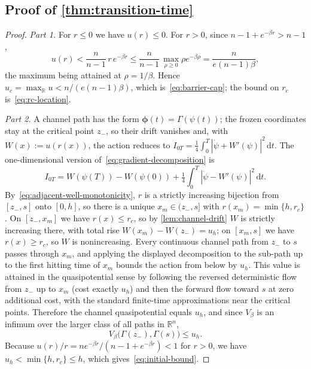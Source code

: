 \documentclass{article}
\newcommand{\dd}{\mathrm d}
\theoremstyle{plain}
\theoremstyle{definition}
\theoremstyle{remark}
\newcommand{\R}{\mathbb{R}}
\begin{document}
\subsection{Proof of \texorpdfstring{\ref{thm:transition-time}}{Theorem 3.1}}
 
\begin{proof}
\emph{Part 1.}
For \(r\le0\) we have \(u(r)\le0\). For \(r>0\), since \(n-1+e^{-\beta r}>n-1\),
\[
    u(r)<\frac{n}{n-1}\,r\,e^{-\beta r}
    \le\frac{n}{n-1}\,\max_{\rho\ge0}\rho e^{-\beta\rho}
    =\frac{n}{e(n-1)\beta},
\]
the maximum being attained at \(\rho=1/\beta\). Hence \(u_c=\max_\R u<n/(e(n-1)\beta)\), which is~\eqref{eq:barrier-cap}; the bound on \(r_c\) is~\eqref{eq:rc-location}.
 
\emph{Part 2.}
A channel path has the form \(\boldsymbol\phi(t)=\Gamma(\psi(t))\); the frozen coordinates stay at the critical point \(z_-\), so their drift vanishes and, with \(W(x):=u(r(x))\), the action reduces to \(I_{0T}=\tfrac14\int_0^T|\dot\psi+W'(\psi)|^2\,\dd t\). The one-dimensional version of~\eqref{eq:gradient-decomposition} is
\[
    I_{0T}=W(\psi(T))-W(\psi(0))+\tfrac14\int_0^T|\dot\psi-W'(\psi)|^2\,\dd t .
\]
By~\eqref{eq:adjacent-well-monotonicity}, \(r\) is a strictly increasing bijection from \([z_-,s]\) onto \([0,h]\), so there is a unique \(x_m\in(z_-,s]\) with \(r(x_m)=\min\{h,r_c\}\). On \([z_-,x_m]\) we have \(r(x)\le r_c\), so by \ref{lem:channel-drift} \(W\) is strictly increasing there, with total rise \(W(x_m)-W(z_-)=u_h\); on \([x_m,s]\) we have \(r(x)\ge r_c\), so \(W\) is nonincreasing. Every continuous channel path from \(z_-\) to \(s\) passes through \(x_m\), and applying the displayed decomposition to the sub-path up to the first hitting time of \(x_m\) bounds the action from below by \(u_h\). This value is attained in the quasipotential sense by following the reversed deterministic flow from \(z_-\) up to \(x_m\) (cost exactly \(u_h\)) and then the forward flow toward \(s\) at zero additional cost, with the standard finite-time approximations near the critical points. Therefore the channel quasipotential equals \(u_h\), and since \(V_\beta\) is an infimum over the larger class of all paths in \(\R^n\),
\[
    V_\beta\bigl(\Gamma(z_-),\Gamma(s)\bigr)\le u_h .
\]
Because \(u(r)/r=ne^{-\beta r}/(n-1+e^{-\beta r})<1\) for \(r>0\), we have \(u_h<\min\{h,r_c\}\le h\), which gives~\eqref{eq:initial-bound}.
 

\end{proof}
\end{document}
